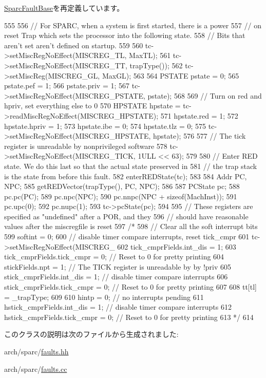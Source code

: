 \hyperlink{classSparcISA_1_1SparcFaultBase_a2bd783b42262278d41157d428e1f8d6f}{SparcFaultBase}を再定義しています。


\begin{DoxyCode}
555 {
556     // For SPARC, when a system is first started, there is a power
557     // on reset Trap which sets the processor into the following state.
558     // Bits that aren't set aren't defined on startup.
559 
560     tc->setMiscRegNoEffect(MISCREG_TL, MaxTL);
561     tc->setMiscRegNoEffect(MISCREG_TT, trapType());
562     tc->setMiscReg(MISCREG_GL, MaxGL);
563 
564     PSTATE pstate = 0;
565     pstate.pef = 1;
566     pstate.priv = 1;
567     tc->setMiscRegNoEffect(MISCREG_PSTATE, pstate);
568 
569     // Turn on red and hpriv, set everything else to 0
570     HPSTATE hpstate = tc->readMiscRegNoEffect(MISCREG_HPSTATE);
571     hpstate.red = 1;
572     hpstate.hpriv = 1;
573     hpstate.ibe = 0;
574     hpstate.tlz = 0;
575     tc->setMiscRegNoEffect(MISCREG_HPSTATE, hpstate);
576 
577     // The tick register is unreadable by nonprivileged software
578     tc->setMiscRegNoEffect(MISCREG_TICK, 1ULL << 63);
579 
580     // Enter RED state. We do this last so that the actual state preserved in
581     // the trap stack is the state from before this fault.
582     enterREDState(tc);
583 
584     Addr PC, NPC;
585     getREDVector(trapType(), PC, NPC);
586 
587     PCState pc;
588     pc.pc(PC);
589     pc.npc(NPC);
590     pc.nnpc(NPC + sizeof(MachInst));
591     pc.upc(0);
592     pc.nupc(1);
593     tc->pcState(pc);
594 
595     // These registers are specified as "undefined" after a POR, and they
596     // should have reasonable values after the miscregfile is reset
597     /*
598     // Clear all the soft interrupt bits
599     softint = 0;
600     // disable timer compare interrupts, reset tick_cmpr
601     tc->setMiscRegNoEffect(MISCREG_
602     tick_cmprFields.int_dis = 1;
603     tick_cmprFields.tick_cmpr = 0; // Reset to 0 for pretty printing
604     stickFields.npt = 1; // The TICK register is unreadable by by !priv
605     stick_cmprFields.int_dis = 1; // disable timer compare interrupts
606     stick_cmprFields.tick_cmpr = 0; // Reset to 0 for pretty printing
607 
608     tt[tl] = _trapType;
609 
610     hintp = 0; // no interrupts pending
611     hstick_cmprFields.int_dis = 1; // disable timer compare interrupts
612     hstick_cmprFields.tick_cmpr = 0; // Reset to 0 for pretty printing
613     */
614 }
\end{DoxyCode}


このクラスの説明は次のファイルから生成されました:\begin{DoxyCompactItemize}
\item 
arch/sparc/\hyperlink{arch_2sparc_2faults_8hh}{faults.hh}\item 
arch/sparc/\hyperlink{arch_2sparc_2faults_8cc}{faults.cc}\end{DoxyCompactItemize}
